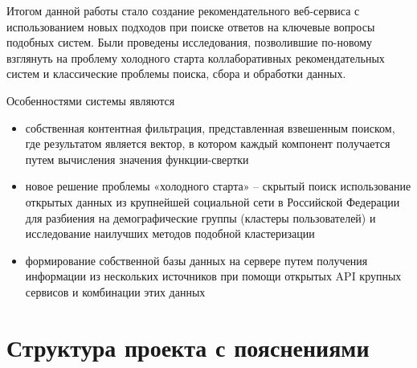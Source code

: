 \Conc

Итогом данной работы стало создание рекомендательного веб-сервиса с использованием новых подходов при поиске ответов на ключевые вопросы подобных систем. Были проведены исследования, позволившие по-новому взглянуть на проблему холодного старта коллаборативных рекомендательных систем и классические проблемы поиска, сбора и обработки данных.

Особенностями системы являются
\begin{itemize}
\item собственная контентная фильтрация, представленная взвешенным поиском, где результатом является вектор, в котором каждый компонент получается путем вычисления значения функции-свертки
\item новое решение проблемы «холодного старта» – скрытый поиск использование открытых данных из крупнейшей социальной сети в Российской Федерации для разбиения на демографические группы (кластеры пользователей) и исследование наилучших методов подобной кластеризации
\item формирование собственной базы данных на сервере путем получения информации из нескольких источников при помощи открытых API крупных сервисов и комбинации этих данных
\end{itemize}

\printbibliography[%
    heading=bibintoc%
    ,title=Библиография %
]

\appendix
{}

\section{Структура проекта с пояснениями}

